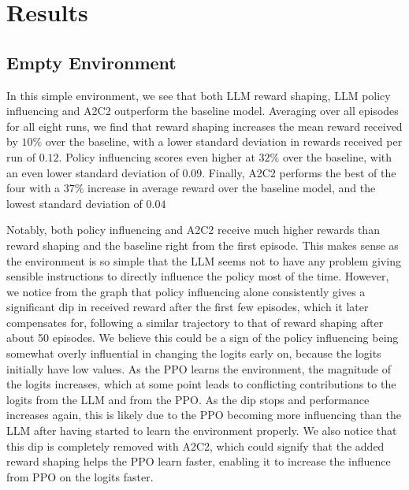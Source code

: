 \documentclass[conference]{IEEEtran}
\begin{document}
\section{Results}

\subsection{Empty Environment}

In this simple environment, we see that both LLM reward shaping, LLM policy influencing and A2C2 outperform the baseline model. Averaging over all episodes for all eight runs, we find that reward shaping increases the mean reward received by $10\%$ over the baseline, with a lower standard deviation in rewards received per run of $0.12$. Policy influencing scores even higher at $32\%$ over the baseline, with an even lower standard deviation of $0.09$. Finally, A2C2 performs the best of the four with a $37\%$ increase in average reward over the baseline model, and the lowest standard deviation of $0.04$

Notably, both policy influencing and A2C2 receive much higher rewards than reward shaping and the baseline right from the first episode. This makes sense as the environment is so simple that the LLM seems not to have any problem giving sensible instructions to directly influence the policy most of the time. However, we notice from the graph that policy influencing alone consistently gives a significant dip in received reward after the first few episodes, which it later compensates for, following a similar trajectory to that of reward shaping after about 50 episodes. We believe this could be a sign of the policy influencing being somewhat overly influential in changing the logits early on, because the logits initially have low values. As the PPO learns the environment, the magnitude of the logits increases, which at some point leads to conflicting contributions to the logits from the LLM and from the PPO. As the dip stops and performance increases again, this is likely due to the PPO becoming more influencing than the LLM after having started to learn the environment properly. We also notice that this dip is completely removed with A2C2, which could signify that the added reward shaping helps the PPO learn faster, enabling it to increase the influence from PPO on the logits faster.
\end{document}
